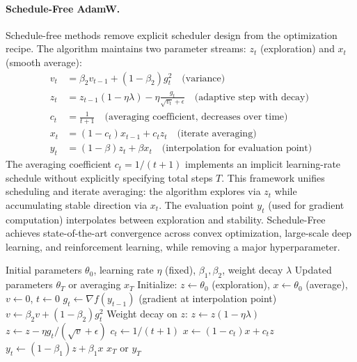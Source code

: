 \paragraph{Schedule-Free AdamW.}
Schedule-free methods remove explicit scheduler design from the optimization recipe. The algorithm maintains two parameter streams: $z_t$ (exploration) and $x_t$ (smooth average):
\begin{align}
v_t &= \beta_2 v_{t-1} + (1-\beta_2)g_t^2 \quad\text{(variance)} \\
z_t &= z_{t-1}(1-\eta\lambda) - \eta\frac{g_t}{\sqrt{v_t}+\epsilon} \quad\text{(adaptive step with decay)} \\
c_t &= \frac{1}{t+1} \quad\text{(averaging coefficient, decreases over time)} \\
x_t &= (1-c_t)x_{t-1} + c_t z_t \quad\text{(iterate averaging)} \\
y_t &= (1-\beta)z_t + \beta x_t \quad\text{(interpolation for evaluation point)}
\end{align}
The averaging coefficient $c_t = 1/(t+1)$ implements an implicit learning-rate schedule without explicitly specifying total steps $T$. This framework unifies scheduling and iterate averaging: the algorithm explores via $z_t$ while accumulating stable direction via $x_t$. The evaluation point $y_t$ (used for gradient computation) interpolates between exploration and stability. Schedule-Free achieves state-of-the-art convergence across convex optimization, large-scale deep learning, and reinforcement learning, while removing a major hyperparameter.

\begin{algorithm}[H]
\caption{Schedule-Free AdamW}
\label{alg:schedulefree}
\begin{algorithmic}[1]
\Require Initial parameters $\theta_0$, learning rate $\eta$ (fixed), $\beta_1, \beta_2$, weight decay $\lambda$
\Ensure Updated parameters $\theta_T$ or averaging $x_T$
\State Initialize: $z \gets \theta_0$ (exploration), $x \gets \theta_0$ (average), $v \gets 0$, $t \gets 0$
    \State $g_t \gets \nabla f(y_{t-1})$ (gradient at interpolation point)
    \State $v \gets \beta_2 v + (1-\beta_2) g_t^2$ 
    \State Weight decay on $z$: $z \gets z(1 - \eta\lambda)$
    \State $z \gets z - \eta g_t / (\sqrt{v} + \epsilon)$ 
    \State $c_t \gets 1 / (t+1)$ 
    \State $x \gets (1-c_t) x + c_t z$ 
    \State $y_t \gets (1-\beta_1) z + \beta_1 x$ 
\EndFor
\Return $x_T$ or $y_T$
\end{algorithmic}
\end{algorithm}

